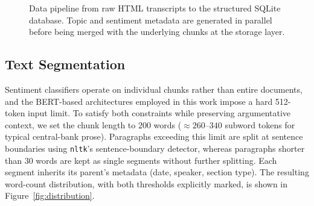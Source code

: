 \begin{figure}[ht]
    \centering
    \caption[ECB-transcript data pipeline]{Data pipeline from raw HTML
        transcripts to the structured SQLite database. Topic and sentiment
        metadata are generated in parallel before being merged with the
        underlying chunks at the storage layer.}
    \label{fig:data_pipeline_snake}
\end{figure}

\subsection{Text Segmentation}
\label{sec:segmentation}

Sentiment classifiers operate on individual chunks rather than entire documents, and the BERT-based architectures employed in this work impose a hard 512-token input limit. To satisfy both constraints while preserving argumentative context, we set the chunk length to $200$ words (${\approx}260$--$340$ subword tokens for typical central-bank prose). Paragraphs exceeding this limit are split at sentence boundaries using \texttt{nltk}'s sentence-boundary detector, whereas paragraphs shorter than $30$ words are kept as single segments without further splitting. Each segment inherits its parent's metadata (date, speaker, section type). The resulting word-count distribution, with both thresholds explicitly marked, is shown in Figure~\ref{fig:distribution}.


